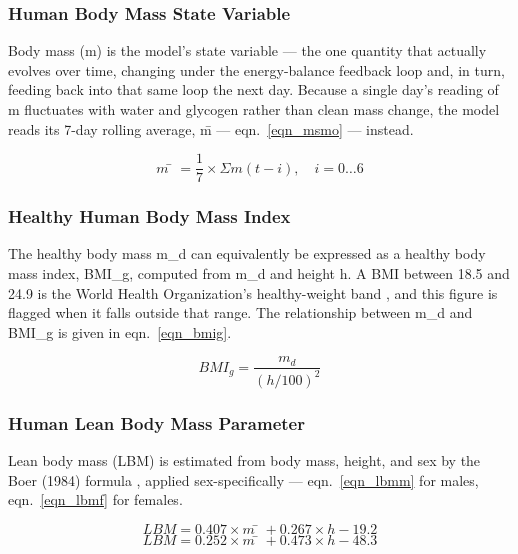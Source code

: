 \subsubsection{Human Body Mass State Variable}

Body mass (m) is the model's state variable — the one quantity that actually evolves over time, changing under the energy-balance feedback loop and, in turn, feeding back into that same loop the next day. Because a single day's reading of m fluctuates with water and glycogen rather than clean mass change, the model reads its 7-day rolling average, m̄ — eqn.~\eqref{eqn_msmo} — instead.

\begin{equation}
\label{eqn_msmo}
m̄ = \frac{1}{7} × Σ m(t−i), \quad i = 0…6
\end{equation}

\subsubsection{Healthy Human Body Mass Index}

The healthy body mass m_d can equivalently be expressed as a healthy body mass index, BMI_g, computed from m_d and height h. A BMI between 18.5 and 24.9 is the World Health Organization's healthy-weight band \cite{ref_who1995}, and this figure is flagged when it falls outside that range. The relationship between m_d and BMI_g is given in eqn.~\eqref{eqn_bmig}.

\begin{equation}
\label{eqn_bmig}
BMI_{g} = \frac{m_{d}}{(h/100)^{2}}
\end{equation}

\subsubsection{Human Lean Body Mass Parameter}

Lean body mass (LBM) is estimated from body mass, height, and sex by the Boer (1984) formula \cite{ref_boer1984}, applied sex-specifically — eqn.~\eqref{eqn_lbmm} for males, eqn.~\eqref{eqn_lbmf} for females.

\begin{equation}
\label{eqn_lbmm}
LBM = 0.407×m̄ + 0.267×h − 19.2
\end{equation}
\begin{equation}
\label{eqn_lbmf}
LBM = 0.252×m̄ + 0.473×h − 48.3
\end{equation}

